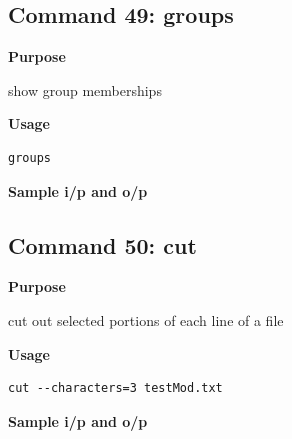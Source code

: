 \documentclass{article}
\begin{document}
\subsection{Command 49: groups} 
\textbf{Purpose}
\begin{flushleft}
 show group memberships
\end{flushleft}
\textbf{Usage}
\begin{verbatim}
groups
\end{verbatim}
\textbf{Sample i/p and o/p}
\begin{figure}[H] 
\end{figure}
\subsection{Command 50: cut} 
\textbf{Purpose}
\begin{flushleft}
 cut out selected portions of each line of a file
\end{flushleft}
\textbf{Usage}
\begin{verbatim}
cut --characters=3 testMod.txt
\end{verbatim}
\textbf{Sample i/p and o/p}
\begin{figure}[H] 
\end{figure}
\end{document}
